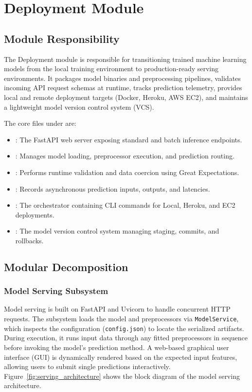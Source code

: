 \section{Deployment Module}

\subsection{Module Responsibility}
\noindent The Deployment module is responsible for transitioning trained machine learning models from the local training environment to production-ready serving environments. It packages model binaries and preprocessing pipelines, validates incoming API request schemas at runtime, tracks prediction telemetry, provides local and remote deployment targets (Docker, Heroku, AWS EC2), and maintains a lightweight model version control system (VCS).

The core files under  are:
\begin{itemize}[leftmargin=*]
  \item {}: The FastAPI web server exposing standard and batch inference endpoints.
  \item {}: Manages model loading, preprocessor execution, and prediction routing.
  \item {}: Performs runtime validation and data coercion using Great Expectations.
  \item {}: Records asynchronous prediction inputs, outputs, and latencies.
  \item {}: The orchestrator containing CLI commands for Local, Heroku, and EC2 deployments.
  \item {}: The model version control system managing staging, commits, and rollbacks.
\end{itemize}

\subsection{Modular Decomposition}

\subsubsection{Model Serving Subsystem}
\noindent Model serving is built on FastAPI and Uvicorn to handle concurrent HTTP requests. The subsystem loads the model and preprocessors via \texttt{ModelService}, which inspects the configuration (\texttt{config.json}) to locate the serialized artifacts. During execution, it runs input data through any fitted preprocessors in sequence before invoking the model's prediction method. A web-based graphical user interface (GUI) is dynamically rendered based on the expected input features, allowing users to submit single predictions interactively. Figure~\ref{fig:serving_architecture} shows the block diagram of the model serving architecture.

